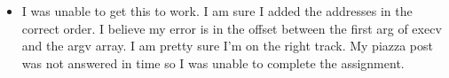 \documentclass[11pt]{article}
\begin{document}
\begin{itemize}
\item I was unable to get this to work. I am sure I added the addresses in the correct order. I believe my error is in the offset between the first arg of execv and the argv array. I am pretty sure I'm on the right track. My piazza post was not answered in time so I was unable to complete the assignment.
\end{itemize}
\end{document}
